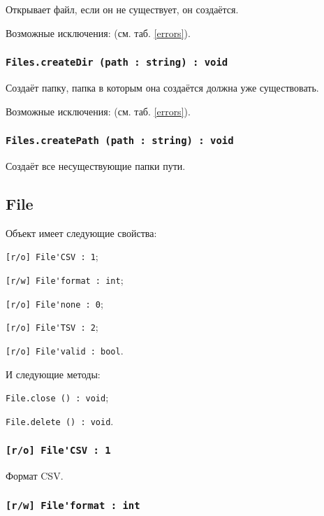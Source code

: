 Открывает файл, если он не существует, он создаётся.

Возможные исключения:  (см. таб. \ref{errors}).

\subsubsection{\lstinline|Files.createDir (path : string) : void|}

Создаёт папку, папка в которым она создаётся должна уже существовать.

Возможные исключения:  (см. таб. \ref{errors}).

\subsubsection{\lstinline|Files.createPath (path : string) : void|}

Создаёт все несуществующие папки пути.

\subsection{{\color{orange} File}}

Объект \file{} имеет следующие свойства:
\begin{icItems}
	\item \lstinline|[r/o] File'CSV : 1|;
	\item \lstinline|[r/w] File'format : int|;
	\item \lstinline|[r/o] File'none : 0|;
	\item \lstinline|[r/o] File'TSV : 2|;
	\item \lstinline|[r/o] File'valid : bool|.
\end{icItems}

И следующие методы:
\begin{icItems}
	\item \lstinline|File.close () : void|;
	\item \lstinline|File.delete () : void|.
\end{icItems}

\subsubsection{\lstinline|[r/o] File'CSV : 1|}

Формат CSV.

\subsubsection{\lstinline|[r/w] File'format : int|}

